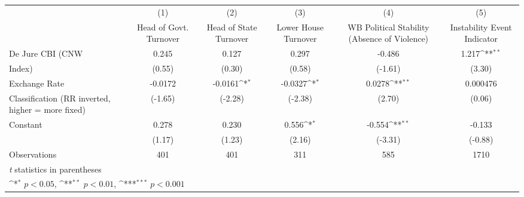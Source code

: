 {
\def\sym#1{\ifmmode^{#1}\else\(^{#1}\)\fi}
\begin{tabular}{l*{5}{c}}
\toprule
                &\multicolumn{1}{c}{(1)}&\multicolumn{1}{c}{(2)}&\multicolumn{1}{c}{(3)}&\multicolumn{1}{c}{(4)}&\multicolumn{1}{c}{(5)}\\
                &\multicolumn{1}{c}{Head of Govt. Turnover}&\multicolumn{1}{c}{Head of State Turnover}&\multicolumn{1}{c}{Lower House Turnover}&\multicolumn{1}{c}{WB Political Stability (Absence of Violence)}&\multicolumn{1}{c}{Instability Event Indicator}\\
\midrule
De Jure CBI (CNW&    0.245         &    0.127         &    0.297         &   -0.486         &    1.217\sym{**} \\
Index)          &   (0.55)         &   (0.30)         &   (0.58)         &  (-1.61)         &   (3.30)         \\
\addlinespace
Exchange Rate   &  -0.0172         &  -0.0161\sym{*}  &  -0.0327\sym{*}  &   0.0278\sym{**} & 0.000476         \\
Classification (RR inverted, higher = more fixed)&  (-1.65)         &  (-2.28)         &  (-2.38)         &   (2.70)         &   (0.06)         \\
\addlinespace
Constant        &    0.278         &    0.230         &    0.556\sym{*}  &   -0.554\sym{**} &   -0.133         \\
                &   (1.17)         &   (1.23)         &   (2.16)         &  (-3.31)         &  (-0.88)         \\
\midrule
Observations    &      401         &      401         &      311         &      585         &     1710         \\
\bottomrule
\multicolumn{6}{l}{\footnotesize \textit{t} statistics in parentheses}\\
\multicolumn{6}{l}{\footnotesize \sym{*} \(p<0.05\), \sym{**} \(p<0.01\), \sym{***} \(p<0.001\)}\\
\end{tabular}
}
